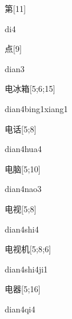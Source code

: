 \begin{verbete}[di4]{第}[11]
\begin{pronuncia}{di4}
\end{pronuncia}
\end{verbete}

\begin{verbete}[dian3]{点}[9]
\begin{pronuncia}{dian3}
\end{pronuncia}
\end{verbete}

\begin{verbete}{电冰箱}[5;6;15]
\begin{pronuncia}[\\]{dian4bing1xiang1}
\end{pronuncia}
\end{verbete}

\begin{verbete}{电话}[5;8]
\begin{pronuncia}{dian4hua4}
\end{pronuncia}
\end{verbete}

\begin{verbete}{电脑}[5;10]
\begin{pronuncia}{dian4nao3}
\end{pronuncia}
\end{verbete}

\begin{verbete}{电视}[5;8]
\begin{pronuncia}{dian4shi4}
\end{pronuncia}
\end{verbete}

\begin{verbete}{电视机}[5;8;6]
\begin{pronuncia}{dian4shi4ji1}
\end{pronuncia}
\end{verbete}

\begin{verbete}[dian4qi4]{电器}[5;16]
\begin{pronuncia}{dian4qi4}
\end{pronuncia}
\end{verbete}

